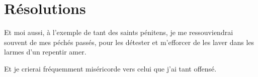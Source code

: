 \documentclass[instructions.tex]{subfiles}
\begin{document}
\section{Résolutions}
 
\primo Et moi aussi, à l’exemple de tant des saints pénitens, je me ressouviendrai souvent de mes péchés passés, pour les détester et m’efforcer de les laver dans les larmes d’un repentir amer.
 
\secundo Et je crierai fréquemment miséricorde vers celui que j’ai tant offensé. 

 
\end{document}
